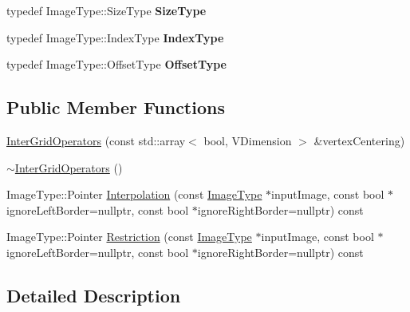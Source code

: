 \begin{DoxyCompactItemize}
\item 
\hypertarget{classitk_1_1mad_1_1_inter_grid_operators_aae9b6fe92d7ff591d1eb14584a52a36e}{typedef Image\-Type\-::\-Size\-Type {\bfseries Size\-Type}}\label{classitk_1_1mad_1_1_inter_grid_operators_aae9b6fe92d7ff591d1eb14584a52a36e}

\item 
\hypertarget{classitk_1_1mad_1_1_inter_grid_operators_ad3726bb2b8dee0d8a53c5fe66a45dbfa}{typedef Image\-Type\-::\-Index\-Type {\bfseries Index\-Type}}\label{classitk_1_1mad_1_1_inter_grid_operators_ad3726bb2b8dee0d8a53c5fe66a45dbfa}

\item 
\hypertarget{classitk_1_1mad_1_1_inter_grid_operators_ad9296508483355dcc2b4cbeb9cf53842}{typedef Image\-Type\-::\-Offset\-Type {\bfseries Offset\-Type}}\label{classitk_1_1mad_1_1_inter_grid_operators_ad9296508483355dcc2b4cbeb9cf53842}

\end{DoxyCompactItemize}
\subsection*{Public Member Functions}
\begin{DoxyCompactItemize}
\item 
\hyperlink{classitk_1_1mad_1_1_inter_grid_operators_ad55220f99bb3317126f3aec19be4c70c}{Inter\-Grid\-Operators} (const std\-::array$<$ bool, V\-Dimension $>$ \&vertex\-Centering)
\item 
\hyperlink{classitk_1_1mad_1_1_inter_grid_operators_a9ae3dcea3ec15339e389163153bc9656}{$\sim$\-Inter\-Grid\-Operators} ()
\item 
Image\-Type\-::\-Pointer \hyperlink{classitk_1_1mad_1_1_inter_grid_operators_a970d50f9b0a8d3815654d36362abfce5}{Interpolation} (const \hyperlink{class_image}{Image\-Type} $\ast$input\-Image, const bool $\ast$ignore\-Left\-Border=nullptr, const bool $\ast$ignore\-Right\-Border=nullptr) const 
\item 
Image\-Type\-::\-Pointer \hyperlink{classitk_1_1mad_1_1_inter_grid_operators_ae99632c351ddaa07d311141c3eb8cd21}{Restriction} (const \hyperlink{class_image}{Image\-Type} $\ast$input\-Image, const bool $\ast$ignore\-Left\-Border=nullptr, const bool $\ast$ignore\-Right\-Border=nullptr) const 
\end{DoxyCompactItemize}


\subsection{Detailed Description}
